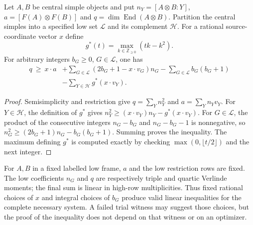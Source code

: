 \begin{proposition}
\label{prop:m5-integral-fusion-norm}
Let $A,B$ be central simple objects and put $n_Y=[A\otimes B:Y]$,
$a=[F(A)\otimes F(B)]$ and $q=\dim\operatorname{End}(A\otimes B)$.
Partition the central simples into a specified low set $\mathcal L$
and its complement $\mathcal H$. For a rational source-coordinate
vector $x$ define
\[
 g^*(t)=\max_{k\in\mathbb Z_{\geq0}}(tk-k^2).
\]
For arbitrary integers $b_G\geq0$, $G\in\mathcal L$, one has
\begin{align*}
 q\ \geq\ x\cdot a
 &+\sum_{G\in\mathcal L}(2b_G+1-x\cdot v_G)n_G
   -\sum_{G\in\mathcal L}b_G(b_G+1)\\
 &-\sum_{Y\in\mathcal H}g^*(x\cdot v_Y).
\end{align*}
\end{proposition}
\begin{proof}
Semisimplicity and restriction give $q=\sum_Yn_Y^2$ and
$a=\sum_Yn_Yv_Y$. For $Y\in\mathcal H$, the definition of $g^*$ gives
$n_Y^2\geq(x\cdot v_Y)n_Y-g^*(x\cdot v_Y)$.
For $G\in\mathcal L$, the product of the consecutive integers
$n_G-b_G$ and $n_G-b_G-1$ is nonnegative, so
$n_G^2\geq(2b_G+1)n_G-b_G(b_G+1)$. Summing proves the inequality.
The maximum defining $g^*$ is computed exactly by checking
$\max(0,\lfloor t/2\rfloor)$ and the next integer.
\end{proof}

For $A,B$ in a fixed labelled low frame, $a$ and the low restriction
rows are fixed. The low coefficients $n_G$ and $q$ are respectively triple and
quartic Verlinde moments; the final sum is linear in high-row
multiplicities. Thus fixed rational choices of $x$ and integral choices
of $b_G$ produce valid linear inequalities for the complete necessary
system. A failed trial witness may suggest those choices, but the proof
of the inequality does not depend on that witness or on an optimizer.

